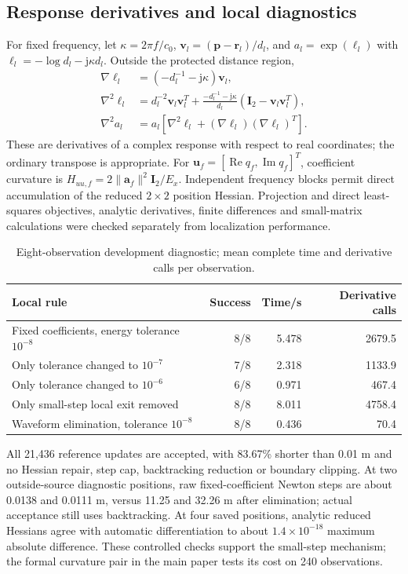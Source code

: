 \documentclass[a4paper,12pt,review]{cas-sc}
\newcommand{\Rea}{\operatorname{Re}}\newcommand{\tr}{\operatorname{tr}}
\begin{document}
\subsection{Response derivatives and local diagnostics}
For fixed frequency, let $\kappa=2\pi f/c_0$, $\bm v_l=(\bm p-\bm r_l)/d_l$, and $a_l=\exp(\ell_l)$ with $\ell_l=-\log d_l-\mathrm j\kappa d_l$. Outside the protected distance region,
\begin{align}
\nabla\ell_l&=(-d_l^{-1}-\mathrm j\kappa)\bm v_l,\\
\nabla^2\ell_l&=d_l^{-2}\bm v_l\bm v_l^T+
 \frac{-d_l^{-1}-\mathrm j\kappa}{d_l}(\bm I_2-\bm v_l\bm v_l^T),\\
\nabla^2a_l&=a_l[\nabla^2\ell_l+(\nabla\ell_l)(\nabla\ell_l)^T].
\end{align}
These are derivatives of a complex response with respect to real coordinates; the ordinary transpose is appropriate. For $\bm u_f=[\Rea q_f,\operatorname{Im}q_f]^T$, coefficient curvature is $H_{uu,f}=2\|\bm a_f\|^2\bm I_2/E_x$. Independent frequency blocks permit direct accumulation of the reduced $2\times2$ position Hessian. Projection and direct least-squares objectives, analytic derivatives, finite differences and small-matrix calculations were checked separately from localization performance.

\begin{table}[pos=H]\centering\small
\caption{Eight-observation development diagnostic; mean complete time and derivative calls per observation.}\label{sup:development}
\begin{tabular}{@{}lrrr@{}}\toprule
Local rule & Success & Time/s & Derivative calls\\\midrule
Fixed coefficients, energy tolerance $10^{-8}$ & 8/8 & 5.478 & 2679.5\\
Only tolerance changed to $10^{-7}$ & 7/8 & 2.318 & 1133.9\\
Only tolerance changed to $10^{-6}$ & 6/8 & 0.971 & 467.4\\
Only small-step local exit removed & 8/8 & 8.011 & 4758.4\\
Waveform elimination, tolerance $10^{-8}$ & 8/8 & 0.436 & 70.4\\\bottomrule
\end{tabular}\end{table}
All 21,436 reference updates are accepted, with 83.67\% shorter than 0.01 m and no Hessian repair, step cap, backtracking reduction or boundary clipping. At two outside-source diagnostic positions, raw fixed-coefficient Newton steps are about 0.0138 and 0.0111 m, versus 11.25 and 32.26 m after elimination; actual acceptance still uses backtracking. At four saved positions, analytic reduced Hessians agree with automatic differentiation to about $1.4\times10^{-18}$ maximum absolute difference. These controlled checks support the small-step mechanism; the formal curvature pair in the main paper tests its cost on 240 observations.
\end{document}
